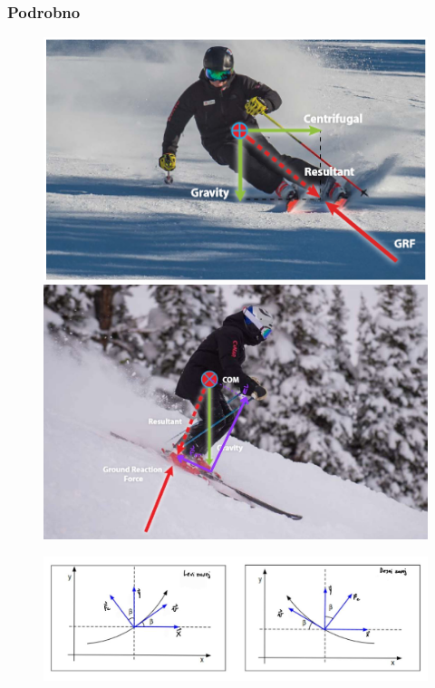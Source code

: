 \documentclass{beamer}
\begin{document}
\begin{frame}
    \frametitle{Podrobno}
    \begin{figure}
        \centering
        \includegraphics[scale=0.4]{../images/Screenshot 2023-12-03 152028.png} 
        \includegraphics[scale=0.09]{../images/Sile pri com.jpg}
    \end{figure}
    \begin{figure}
        \centering
        \includegraphics[scale=0.2]{../images/neke silo ovo ono.jpg} \\
    \end{figure}
\end{frame}
\end{document}

